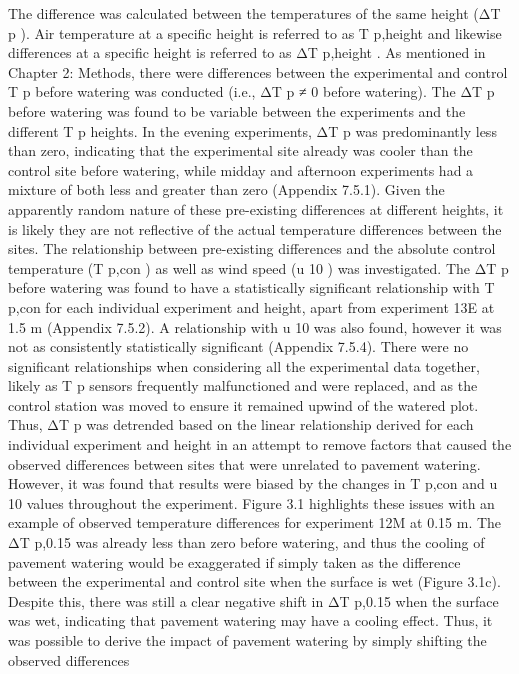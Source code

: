 \documentclass[final,3p,times,authoryear]{elsarticle}
\begin{document}
The difference was calculated between the temperatures of the same height (ΔT p ). Air
temperature at a specific height is referred to as T p,height and likewise differences at a
specific height is referred to as ΔT p,height .
As mentioned in Chapter 2: Methods, there were differences between the experimental
and control T p before watering was conducted (i.e., ΔT p ≠ 0 before watering). The ΔT p
before watering was found to be variable between the experiments and the different T p
heights. In the evening experiments, ΔT p was predominantly less than zero, indicating
that the experimental site already was cooler than the control site before watering, while
midday and afternoon experiments had a mixture of both less and greater than zero
(Appendix 7.5.1). Given the apparently random nature of these pre-existing differences
at different heights, it is likely they are not reflective of the actual temperature
differences between the sites.
The relationship between pre-existing differences and the absolute control temperature
(T p,con ) as well as wind speed (u 10 ) was investigated. The ΔT p before watering was found
to have a statistically significant relationship with T p,con for each individual experiment
and height, apart from experiment 13E at 1.5 m (Appendix 7.5.2). A relationship with
u 10 was also found, however it was not as consistently statistically significant (Appendix
7.5.4). There were no significant relationships when considering all the experimental data together, likely as T p sensors frequently malfunctioned and were replaced, and as
the control station was moved to ensure it remained upwind of the watered plot.
Thus, ΔT p was detrended based on the linear relationship derived for each individual
experiment and height in an attempt to remove factors that caused the observed
differences between sites that were unrelated to pavement watering. However, it was
found that results were biased by the changes in T p,con and u 10 values throughout the
experiment.
Figure 3.1 highlights these issues with an example of observed temperature differences
for experiment 12M at 0.15 m. The ΔT p,0.15 was already less than zero before watering,
and thus the cooling of pavement watering would be exaggerated if simply taken as the
difference between the experimental and control site when the surface is wet (Figure
3.1c). Despite this, there was still a clear negative shift in ΔT p,0.15 when the surface was
wet, indicating that pavement watering may have a cooling effect. Thus, it was possible
to derive the impact of pavement watering by simply shifting the observed differences
\end{document}

